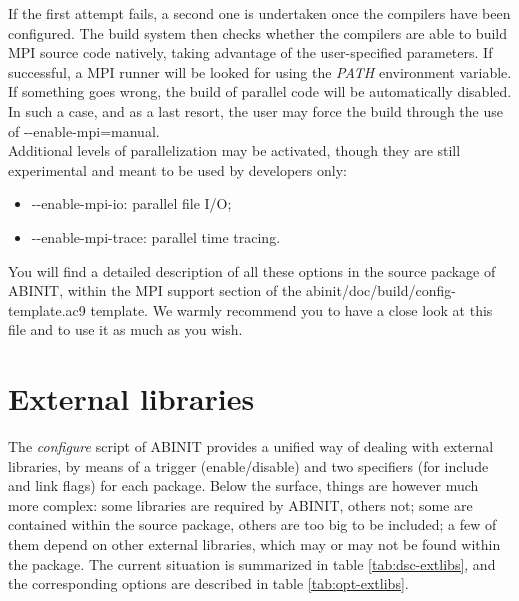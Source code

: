 If the first attempt fails, a second one is undertaken once the compilers
have been configured. The build system then checks whether the compilers
are able to build MPI source code natively, taking advantage of the
user-specified parameters. If successful, a MPI runner will be looked
for using the \textit{PATH} environment variable. If something goes
wrong, the build of parallel code will be automatically disabled.
In such a case, and as a last resort, the user may force the build
through the use of \textquotedbl{}-{-}enable-mpi=manual\textquotedbl{}.
\\


Additional levels of parallelization may be activated, though they
are still experimental and meant to be used by developers only: 
\begin{itemize}
\item \textquotedbl{}-{-}enable-mpi-io\textquotedbl{}: parallel file I/O; 
\item \textquotedbl{}-{-}enable-mpi-trace\textquotedbl{}: parallel time
tracing. 
\end{itemize}
You will find a detailed description of all these options in the source
package of ABINIT, within the MPI support section of the \textquotedbl{}{~}abinit/doc/build/config-template.ac9\textquotedbl{}
template. We warmly recommend you to have a close look at this file
and to use it as much as you wish.


\section{External libraries}

The \textit{configure} script of ABINIT provides a unified way of
dealing with external libraries, by means of a trigger (enable/disable)
and two specifiers (for include and link flags) for each package.
Below the surface, things are however much more complex: some libraries
are required by ABINIT, others not; some are contained within the
source package, others are too big to be included; a few of them depend
on other external libraries, which may or may not be found within
the package. The current situation is summarized in table \ref{tab:dsc-extlibs},
and the corresponding options are described in table \ref{tab:opt-extlibs}.
\\


